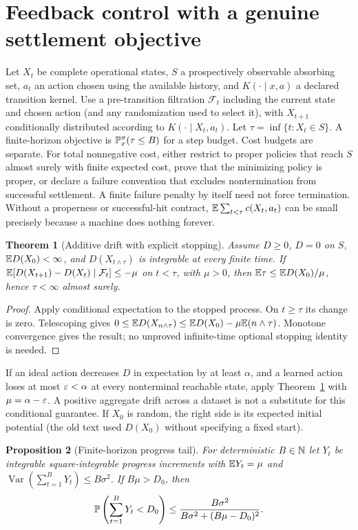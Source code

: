 \documentclass[11pt]{article}
\newtheorem{theorem}{Theorem}[section]\newtheorem{proposition}[theorem]{Proposition}\newtheorem{lemma}[theorem]{Lemma}\newtheorem{corollary}[theorem]{Corollary}
\theoremstyle{definition}\newtheorem{definition}[theorem]{Definition}\newtheorem{example}[theorem]{Example}\newtheorem{conjecture}[theorem]{Conjecture}
\begin{document}
\section{Feedback control with a genuine settlement objective}
Let $X_t$ be complete operational states, $S$ a prospectively observable absorbing set, $a_t$ an action chosen using the available history, and $K(\cdot\mid x,a)$ a declared transition kernel. Use a pre-transition filtration $\mathcal F_t$ including the current state and chosen action (and any randomization used to select it), with $X_{t+1}$ conditionally distributed according to $K(\cdot\mid X_t,a_t)$. Let $\tau=\inf\{t:X_t\in S\}$. A finite-horizon objective is $\mathbb P_x^\pi(\tau\le B)$ for a step budget. Cost budgets are separate. For total nonnegative cost, either restrict to proper policies that reach $S$ almost surely with finite expected cost, prove that the minimizing policy is proper, or declare a failure convention that excludes nontermination from successful settlement. A finite failure penalty by itself need not force termination. Without a properness or successful-hit contract, $\mathbb E\sum_{t<\tau}c(X_t,a_t)$ can be small precisely because a machine does nothing forever.
\begin{theorem}[Additive drift with explicit stopping]\label{thm:drift}
Assume $D\ge0$, $D=0$ on $S$, $\mathbb E D(X_0)<\infty$, and $D(X_{t\wedge\tau})$ is integrable at every finite time. If $\mathbb E[D(X_{t+1})-D(X_t)\mid\mathcal F_t]\le-\mu$ on $t<\tau$, with $\mu>0$, then $\mathbb E\tau\le\mathbb E D(X_0)/\mu$, hence $\tau<\infty$ almost surely.
\end{theorem}
\begin{proof} Apply conditional expectation to the stopped process. On $t\ge\tau$ its change is zero. Telescoping gives $0\le \mathbb E D(X_{n\wedge\tau})\le\mathbb E D(X_0)-\mu\mathbb E(n\wedge\tau)$. Monotone convergence gives the result; no unproved infinite-time optional stopping identity is needed.\end{proof}
If an ideal action decreases $D$ in expectation by at least $\alpha$, and a learned action loses at most $\varepsilon<\alpha$ at every nonterminal reachable state, apply Theorem~\ref{thm:drift} with $\mu=\alpha-\varepsilon$. A positive aggregate drift across a dataset is not a substitute for this conditional guarantee. If $X_0$ is random, the right side is its expected initial potential (the old text used $D(X_0)$ without specifying a fixed start).
\begin{proposition}[Finite-horizon progress tail]
For deterministic $B\in\mathbb N$ let $Y_t$ be integrable square-integrable progress increments with $\mathbb E Y_t=\mu$ and $\operatorname{Var}(\sum_{t=1}^B Y_t)\le B\sigma^2$. If $B\mu>D_0$, then
\[\mathbb P\left(\sum_{t=1}^B Y_t<D_0\right)\le\frac{B\sigma^2}{B\sigma^2+(B\mu-D_0)^2}.\]
\end{proposition}
\end{document}
